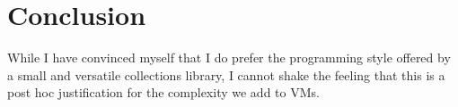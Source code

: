 \documentclass[sigconf, 10pt]{acmart}
\begin{document}
\section{Conclusion}



While I have convinced myself
that I do prefer the programming style offered
by a small and versatile collections library,
I cannot shake the feeling
that this is a post hoc justification
for the complexity we add to VMs.






\end{document}
